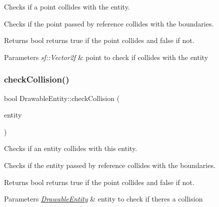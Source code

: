 Checks if a point collides with the entity. 

Checks if the point passed by reference collides with the boundaries.

\begin{DoxyReturn}{Returns}
bool returns true if the point collides and false if not. 
\end{DoxyReturn}

\begin{DoxyParams}{Parameters}
{\em sf\+::\+Vector2f} & point to check if collides with the entity \\
\hline
\end{DoxyParams}
\mbox{\label{class_drawable_entity_a565c4767989b6390b06b52137b249ce5}} 
\subsubsection{\texorpdfstring{check\+Collision()}{checkCollision()}\hspace{0.1cm}{\footnotesize\ttfamily [2/2]}}
{\footnotesize\ttfamily bool Drawable\+Entity\+::check\+Collision (\begin{DoxyParamCaption}\item[{\hyperlink{class_drawable_entity}{Drawable\+Entity} \&}]{entity }\end{DoxyParamCaption})}



Checks if an entity collides with this entity. 

Checks if the entity passed by reference collides with the boundaries.

\begin{DoxyReturn}{Returns}
bool returns true if the point collides and false if not. 
\end{DoxyReturn}

\begin{DoxyParams}{Parameters}
{\em \hyperlink{class_drawable_entity}{Drawable\+Entity}} & entity to check if there\textquotesingle{}s a collision \\
\hline
\end{DoxyParams}
\mbox{\label{class_drawable_entity_a0b0db9c1325defed216d66a5b4cc755e}} 
